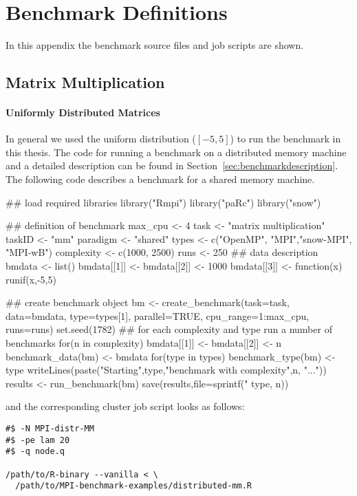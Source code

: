 \chapter{Benchmark Definitions}
\label{app:benchmark}
In this appendix the benchmark source files and job scripts are shown.

\section{Matrix Multiplication}

\subsubsection{Uniformly Distributed Matrices}

In general we used the uniform distribution ($[-5,5]$) to run the
benchmark in this thesis. The code for running a benchmark on a
distributed memory machine and a detailed description can
be found in Section~\ref{sec:benchmarkdescription}. The following code
describes a benchmark for a shared memory machine.

\begin{Scode}
## load required libraries
library("Rmpi")
library("paRc")
library("snow")

## definition of benchmark
max_cpu <- 4
task <- "matrix multiplication"
taskID <- "mm"
paradigm <- "shared"
types <- c("OpenMP", "MPI","snow-MPI", "MPI-wB")
complexity <- c(1000, 2500)
runs <- 250
## data description
bmdata <- list()
bmdata[[1]] <- bmdata[[2]] <- 1000
bmdata[[3]] <- function(x){
  runif(x,-5,5)
}

## create benchmark object
bm <- create_benchmark(task=task, data=bmdata,
                       type=types[1], parallel=TRUE,
                       cpu_range=1:max_cpu, runs=runs)
set.seed(1782)
## for each complexity and type run a number of benchmarks
for(n in complexity){
  bmdata[[1]] <- bmdata[[2]] <- n
  benchmark_data(bm) <- bmdata
  for(type in types){
    benchmark_type(bm) <- type
    writeLines(paste("Starting",type,"benchmark with complexity",n,
                     "..."))
    results <- run_benchmark(bm)
    save(results,file=sprintf("%
                               type, n))
  }
}
\end{Scode}

and the corresponding cluster job script looks as follows:

\begin{verbatim}
#$ -N MPI-distr-MM
#$ -pe lam 20
#$ -q node.q

/path/to/R-binary --vanilla < \
  /path/to/MPI-benchmark-examples/distributed-mm.R
\end{verbatim}

